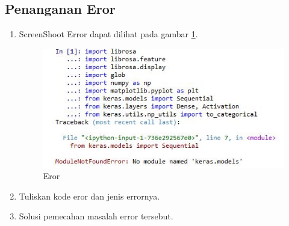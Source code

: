 \subsection{Penanganan Eror}
\begin{enumerate}
\item ScreenShoot Error dapat dilihat pada gambar \ref{c6_17}.
\begin{figure}[!htbp]
	\centerline{\includegraphics[width=1\textwidth]{figures/huda/chapter6/eror.JPG}}
	\caption{Eror}
	\label{c6_17}
\end{figure}
\item Tuliskan kode eror dan jenis errornya.

\item Solusi pemecahan masalah error tersebut.

\end{enumerate}
